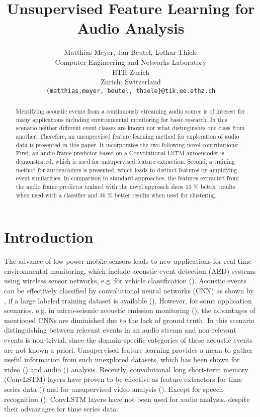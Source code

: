 \documentclass{article} %
\title{Unsupervised Feature Learning for Audio Analysis}
\author{Matthias Meyer, Jan Beutel, Lothar Thiele \\
Computer Engineering and Networks Laboratory\\
ETH Zurich\\
Zurich, Switzerland \\
\texttt{\{matthias.meyer, beutel, thiele\}@tik.ee.ethz.ch} \\
}
\begin{document}
\maketitle

\begin{abstract}
Identifying acoustic events from a continuously streaming audio source is of interest for many applications including environmental monitoring for basic research. In this scenario neither different event classes are known nor what distinguishes one class from another. Therefore, an unsupervised feature learning method for exploration of audio data is presented in this paper. It incorporates the two following novel contributions: First, an audio frame predictor based on a Convolutional LSTM autoencoder is demonstrated, which is used for unsupervised feature extraction. Second, a training method for autoencoders is presented, which leads to distinct features by amplifying event similarities. In comparison to standard approaches, the features extracted from the audio frame predictor trained with the novel approach show 13 \% better results when used with a classifier and 36 \% better results when used for clustering.
\end{abstract}

\section{Introduction}
The advance of low-power mobile sensors leads to new applications for real-time environmental monitoring, which include acoustic event detection (AED) systems using wireless sensor networks, e.g. for vehicle classification (\cite{duarte_vehicle_2004}). Acoustic events can be effectively classified by convolutional neural networks (CNN) as shown by \cite{espi_exploiting_2015}, if a large labeled training dataset is available (\cite{hershey_cnn_2016}). However, for some application scenarios, e.g. in micro-seismic acoustic emission monitoring
(\cite{girard_custom_2012}), the advantages of mentioned CNNs are diminished due to the lack of ground truth. In this scenario distinguishing between relevant events in an audio stream and non-relevant events is non-trivial, since the domain-specific categories of these acoustic events are not known a priori. Unsupervised feature learning provides a mean to gather useful information from such unexplored datasets, which has been shown for video (\cite{srivastava_unsupervised_2015}) and audio (\cite{honglak_lee_unsupervised_2009}) analysis. Recently, convolutional long short-term memory (ConvLSTM) layers have proven to be effective as feature extractors for time series data (\cite{xingjian_convolutional_2015}) and for unsupervised video analysis (\cite{finn_unsupervised_2016}). Except for speech recognition (\cite{zhang_very_2016}), ConvLSTM layers have not been used for audio analysis, despite their advantages for time series data. 
\end{document}
